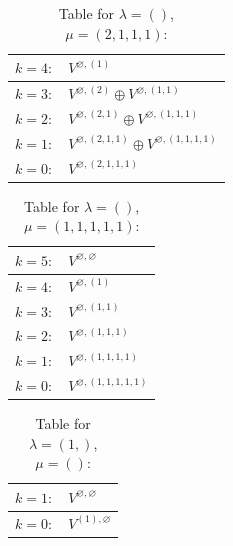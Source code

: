 \documentclass[a4paper,12pt]{article}
\begin{document}
\renewcommand{\arraystretch}{1.6} 
\begin{table}[H]
\centering
\caption{Table for $\lambda = ()$, $\mu = (2, 1, 1, 1)$:}
\begin{tabular}{|>{\centering\arraybackslash}p{15cm}|}
\hline
 $k = 4: \quad V^{\varnothing, (1)} $ \\ \hline
 $k = 3: \quad V^{\varnothing, (2)} \oplus V^{\varnothing, (1, 1)} $ \\ \hline
 $k = 2: \quad V^{\varnothing, (2, 1)} \oplus V^{\varnothing, (1, 1, 1)} $ \\ \hline
 $k = 1: \quad V^{\varnothing, (2, 1, 1)} \oplus V^{\varnothing, (1, 1, 1, 1)} $ \\ \hline
 $k = 0: \quad V^{\varnothing, (2, 1, 1, 1)} $ \\ \hline
\end{tabular}
\end{table}

\renewcommand{\arraystretch}{1.6} 
\begin{table}[H]
\centering
\caption{Table for $\lambda = ()$, $\mu = (1, 1, 1, 1, 1)$:}
\begin{tabular}{|>{\centering\arraybackslash}p{15cm}|}
\hline
 $k = 5: \quad V^{\varnothing, \varnothing} $ \\ \hline
 $k = 4: \quad V^{\varnothing, (1)} $ \\ \hline
 $k = 3: \quad V^{\varnothing, (1, 1)} $ \\ \hline
 $k = 2: \quad V^{\varnothing, (1, 1, 1)} $ \\ \hline
 $k = 1: \quad V^{\varnothing, (1, 1, 1, 1)} $ \\ \hline
 $k = 0: \quad V^{\varnothing, (1, 1, 1, 1, 1)} $ \\ \hline
\end{tabular}
\end{table}

\renewcommand{\arraystretch}{1.6} 
\begin{table}[H]
\centering
\caption{Table for $\lambda = (1,)$, $\mu = ()$:}
\begin{tabular}{|>{\centering\arraybackslash}p{15cm}|}
\hline
 $k = 1: \quad V^{\varnothing, \varnothing} $ \\ \hline
 $k = 0: \quad V^{(1), \varnothing} $ \\ \hline
\end{tabular}
\end{table}
\end{document}
